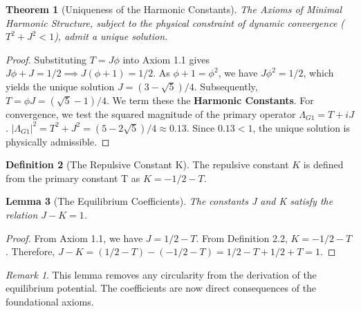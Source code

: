 \documentclass{article}
\theoremstyle{plain}
\newtheorem{theorem}{Theorem}[section]
\newtheorem{lemma}[theorem]{Lemma}
\theoremstyle{definition}
\newtheorem{definition}[theorem]{Definition}
\theoremstyle{remark}
\newtheorem*{remark}{Remark}
\begin{document}
\begin{theorem}[Uniqueness of the Harmonic Constants]
The Axioms of Minimal Harmonic Structure, subject to the physical constraint of dynamic convergence ($T^2+J^2 < 1$), admit a unique solution.
\end{theorem}
\begin{proof}
Substituting $T=J\phi$ into Axiom 1.1 gives $J\phi+J=1/2 \implies J(\phi+1)=1/2$. As $\phi+1=\phi^2$, we have $J\phi^2=1/2$, which yields the unique solution $J=(3-\sqrt{5})/4$. Subsequently, $T=\phi J = (\sqrt{5}-1)/4$. We term these the \textbf{Harmonic Constants}. For convergence, we test the squared magnitude of the primary operator $\Lambda_{G1} = T+iJ$. $|\Lambda_{G1}|^2 = T^2+J^2 = (5-2\sqrt{5})/4 \approx 0.13$. Since $0.13 < 1$, the unique solution is physically admissible.
\end{proof}

\begin{definition}[The Repulsive Constant K]
The repulsive constant $K$ is defined from the primary constant T as $K = -1/2 - T$.
\end{definition}

\begin{lemma}[The Equilibrium Coefficients]
The constants J and K satisfy the relation $J-K=1$.
\end{lemma}
\begin{proof}
From Axiom 1.1, we have $J = 1/2 - T$. From Definition 2.2, $K = -1/2 - T$.
Therefore, $J-K = (1/2 - T) - (-1/2 - T) = 1/2 - T + 1/2 + T = 1$.
\end{proof}

\begin{remark}
This lemma removes any circularity from the derivation of the equilibrium potential. The coefficients are now direct consequences of the foundational axioms.
\end{remark}
\end{document}
